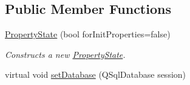 \subsection*{Public Member Functions}
\begin{DoxyCompactItemize}
\item 
\hyperlink{class_picto_1_1_property_state_a98dde166e0aa378f36ad7686ba1a201f}{Property\-State} (bool for\-Init\-Properties=false)
\begin{DoxyCompactList}\small\item\em Constructs a new \hyperlink{class_picto_1_1_property_state}{Property\-State}. \end{DoxyCompactList}\item 
\hypertarget{class_picto_1_1_property_state_a3d7e378c2c94bb7553a69fc0e120b151}{virtual void \hyperlink{class_picto_1_1_property_state_a3d7e378c2c94bb7553a69fc0e120b151}{set\-Database} (Q\-Sql\-Database session)}\label{class_picto_1_1_property_state_a3d7e378c2c94bb7553a69fc0e120b151}


\end{DoxyCompactItemize}

